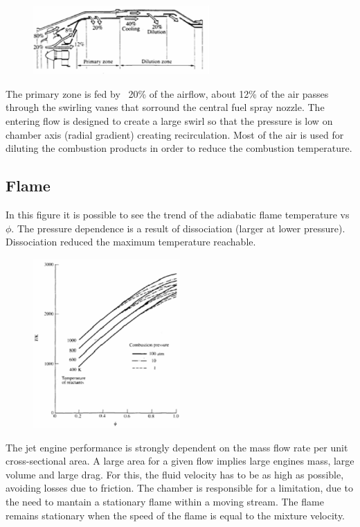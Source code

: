 \documentclass[12pt]{article}
\begin{document}
\begin{figure}[!ht]
\centering
\includegraphics[width=0.6\textwidth]{figures/airdistribution.png}
\end{figure}

The primary zone is fed by ~20\% of the airflow, about 12\% of the air passes through the swirling vanes that sorround the central fuel spray nozzle. The entering flow is designed to create a large swirl so that the pressure is low on chamber axis (radial gradient) creating recirculation. Most of the air is used for diluting the combustion products in order to reduce the combustion temperature.

\subsection{Flame}

In this figure it is possible to see the trend of the adiabatic flame temperature vs $\phi$. The pressure dependence is a result of dissociation (larger at lower pressure). Dissociation reduced the maximum temperature reachable.

\begin{figure}[!ht]
\centering
\includegraphics[width=0.5\textwidth]{figures/tvsphi.png}
\end{figure}

The jet engine performance is strongly dependent on the mass flow rate per unit cross-sectional area. A large area for a given flow implies large engines mass, large volume and large drag. For this, the fluid velocity has to be as high as possible, avoiding losses due to friction. The chamber is responsible for a limitation, due to the need to mantain a stationary flame within a moving stream. The flame remains stationary when the speed of the flame is equal to the mixture velocity.
\end{document}
